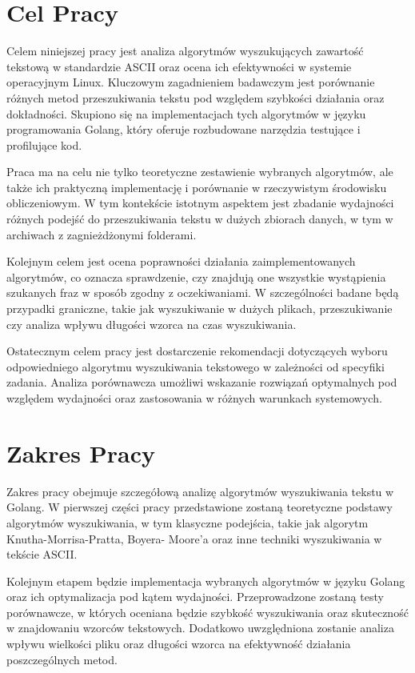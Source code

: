 \section{Cel Pracy}

Celem niniejszej pracy jest analiza algorytmów wyszukujących zawartość tekstową 
w standardzie ASCII oraz ocena ich efektywności w systemie operacyjnym Linux. 
Kluczowym zagadnieniem badawczym jest porównanie różnych metod przeszukiwania 
tekstu pod względem szybkości działania oraz dokładności. Skupiono się na 
implementacjach tych algorytmów w języku programowania Golang, który oferuje
rozbudowane narzędzia testujące i profilujące kod.

Praca ma na celu nie tylko teoretyczne zestawienie wybranych algorytmów, ale 
także ich praktyczną implementację i porównanie w rzeczywistym środowisku 
obliczeniowym. W tym kontekście istotnym aspektem jest zbadanie wydajności 
różnych podejść do przeszukiwania tekstu w dużych zbiorach danych, w tym w 
archiwach z zagnieżdżonymi folderami.

Kolejnym celem jest ocena poprawności działania zaimplementowanych algorytmów, 
co oznacza sprawdzenie, czy znajdują one wszystkie wystąpienia szukanych fraz w 
sposób zgodny z oczekiwaniami. W szczególności badane będą przypadki graniczne, 
takie jak wyszukiwanie w dużych plikach, przeszukiwanie czy analiza wpływu 
długości wzorca na czas wyszukiwania.

Ostatecznym celem pracy jest dostarczenie rekomendacji dotyczących wyboru 
odpowiedniego algorytmu wyszukiwania tekstowego w zależności od specyfiki 
zadania. Analiza porównawcza umożliwi wskazanie rozwiązań optymalnych pod 
względem wydajności oraz zastosowania w różnych warunkach systemowych.

\section{Zakres Pracy}
Zakres pracy obejmuje szczegółową analizę algorytmów wyszukiwania tekstu w Golang.
W pierwszej części pracy przedstawione zostaną teoretyczne podstawy algorytmów wyszukiwania,
w tym klasyczne podejścia, takie jak algorytm Knutha-Morrisa-Pratta, Boyera-
Moore'a oraz inne techniki wyszukiwania w tekście ASCII.

Kolejnym etapem będzie implementacja wybranych algorytmów w języku Golang oraz 
ich optymalizacja pod kątem wydajności. Przeprowadzone zostaną testy porównawcze, 
w których oceniana będzie szybkość wyszukiwania oraz skuteczność w znajdowaniu
wzorców tekstowych. Dodatkowo uwzględniona zostanie analiza wpływu wielkości
pliku oraz długości wzorca na efektywność działania poszczególnych metod.

